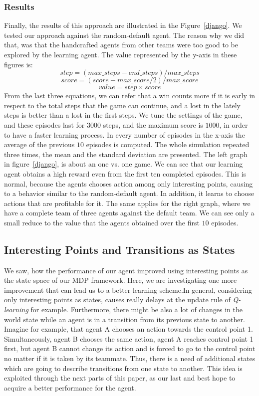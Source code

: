 \documentclass[conference]{IEEEtran}
\begin{document}
\subsubsection{Results}
Finally, the results of this approach are illustrated in the Figure~\ref{django}. We tested our approach against the random-default agent. The reason why we did that, was that the handcrafted agents from other teams were too good to be explored by the learning agent. The value represented by the y-axis in these figures is:
\begin{equation}
step = (max\_steps - end\_steps)/ max\_steps
\end{equation}
\begin{equation}
score = (score - max\_score/2)/max\_score
\end{equation}
\begin{equation}
value = step \times score
\end{equation}
From the last three equations, we can refer that a win counts more if it is early in respect to the total steps that the game can continue, and a lost in the lately steps is better than a lost in the first steps. We tune the settings of the game, and these episodes last for $3000$ steps, and the maximum score is $1000$, in order to have a faster learning process. In every number of episodes in the x-axis the average of the previous $10$ episodes is computed. The whole simulation repeated three times, the mean and the standard deviation are presented. The left graph in figure~\ref{django}, is about an one vs. one game. We can see that our learning agent obtains a high reward even from the first ten completed episodes. This is normal, because the agents chooses action among only interesting points, causing to a behavior similar to the random-default agent. In addition, it learns to choose actions that are profitable for it. The same applies for the right graph, where we have a complete team of three agents against the default team. We can see only a small reduce to the value that the agents obtained over the first $10$ episodes.


\subsection{Interesting Points and Transitions as States}
We saw, how the performance of our agent improved using interesting points as the state space of our MDP framework. Here, we are investigating one more improvement that can lead us to a better learning scheme.In general, considering only interesting points as states, causes really delays at the update rule of \textit{Q-learning} for example. Furthermore, there might be also a lot of changes in the world state while an agent is in a transition from its previous state to another. Imagine for example, that agent A chooses an action towards the control point 1. Simultaneously, agent B chooses the same action, agent A reaches control point 1 first, but agent B cannot change its action and is forced to go to the control point no matter if it is taken by its teammate. Thus, there is a need of additional states which are going to describe transitions from one state to another. This idea is exploited through the next parts of this paper, as our last and best hope to acquire a better performance for the agent.
\end{document}
